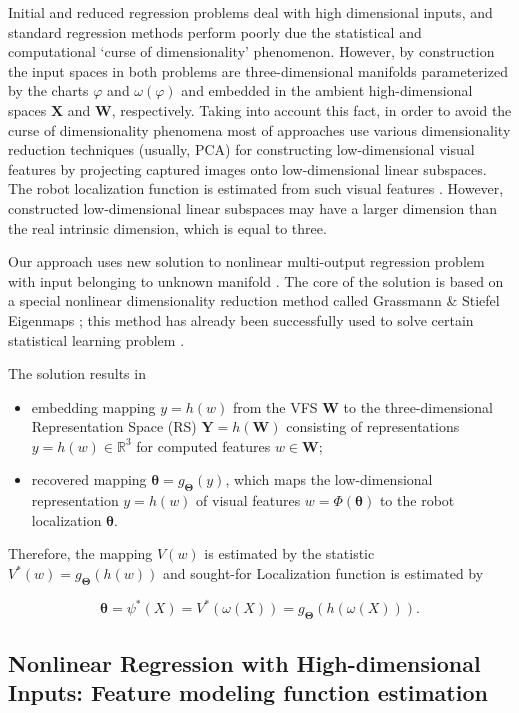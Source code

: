 \documentclass[conference]{IEEEtran} %
\def\mbW{\mathbf{W}}
\def\mbTheta{{\bm\Theta}}
\def\mbtheta{{\bm\theta}}
\def\mbX{\mathbf{X}}
\def\mbY{\mathbf{Y}}
\def\RR{\mathbb{R}}
\begin{document}
Initial and reduced regression problems deal with high dimensional inputs, and standard regression methods perform poorly due the statistical and computational `curse of dimensionality' phenomenon. However, by construction the input spaces in both problems are three-dimensional manifolds parameterized by the charts $\varphi$  and $\omega(\varphi)$ and embedded in the ambient high-dimensional spaces $\mbX$ and $\mbW$, respectively. Taking into account this fact, in order to avoid the curse of dimensionality phenomena most of approaches use various dimensionality reduction techniques (usually, PCA) for constructing low-dimensional visual features by projecting captured images onto low-dimensional linear subspaces. The robot localization function is estimated from such visual features \cite{bib11,bib13,bib14}. However, constructed low-dimensional linear subspaces may have a larger dimension than the real intrinsic dimension, which is equal to three.

Our approach uses new solution to nonlinear multi-output regression problem with input belonging to unknown manifold  \cite{bib20}. The core of the solution is based on a special nonlinear dimensionality reduction method called Grassmann \& Stiefel Eigenmaps \cite{bib21,bib22}; this method has already been successfully used to solve certain statistical learning problem \cite{bib23}.

The solution \cite{bib20} results in 
\begin{itemize}
	\item embedding mapping $y = h(w)$ from the VFS $\mbW$ to the three-dimensional Representation Space (RS) $\mbY = h(\mbW)$ consisting of representations $y = h(w) \in \RR^3$ for computed features $w \in \mbW$;
    \item recovered mapping $\mbtheta= g_{\mbTheta}(y)$, which maps the low-dimensional representation $y = h(w)$ of visual features $w = \Phi(\mbtheta)$ to the robot localization $\mbtheta$. 
\end{itemize}

Therefore, the mapping $V(w)$ is estimated by the statistic $V^*(w) = g_{\mbTheta}(h(w))$ and sought-for Localization function is estimated by

\begin{equation}
\label{eq6}
	\mbtheta = \psi^*(X) = V^*(\omega(X)) = g_{\mbTheta}(h(\omega(X))).	
\end{equation}

\subsection{Nonlinear Regression with High-dimensional Inputs: Feature modeling function estimation}
\end{document}
